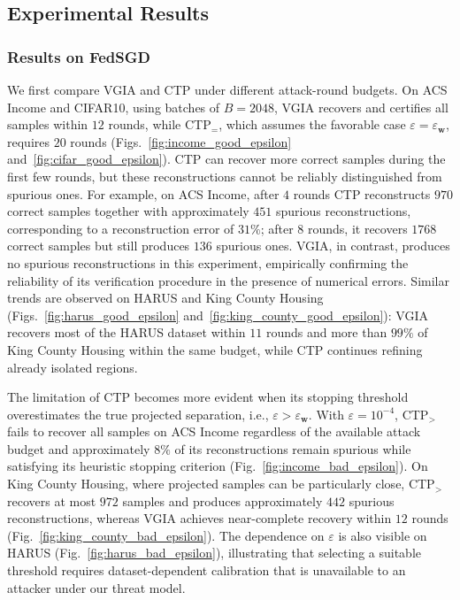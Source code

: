 \subsection{Experimental Results}
\subsubsection{Results on FedSGD}\label{sec:exp_main_vgia}

We first compare VGIA and CTP under different attack-round budgets. On ACS Income and CIFAR10, using batches of $B=2048$, VGIA recovers and certifies all samples within $12$ rounds, while CTP$_{=}$, which assumes the favorable case $\varepsilon=\varepsilon_{\mathbf w}$, requires $20$ rounds (Figs.~\ref{fig:income_good_epsilon} and~\ref{fig:cifar_good_epsilon}). CTP can recover more correct samples during the first few rounds, but these reconstructions cannot be reliably distinguished from spurious ones. For example, on ACS Income, after $4$ rounds CTP reconstructs $970$ correct samples together with approximately $451$ spurious reconstructions, corresponding to a reconstruction error of  $31\%$; after $8$ rounds, it recovers $1768$ correct samples but still produces $136$ spurious ones. VGIA, in contrast, produces no spurious reconstructions in this experiment, empirically confirming the reliability of its verification procedure in the presence of numerical errors. Similar trends are observed on HARUS and King County Housing (Figs.~\ref{fig:harus_good_epsilon} and~\ref{fig:king_county_good_epsilon}): VGIA recovers most of the HARUS dataset within $11$ rounds and more than $99\%$ of King County Housing within the same budget, while CTP continues refining already isolated regions. 

The limitation of CTP becomes more evident when its stopping threshold overestimates the true projected separation, i.e., $\varepsilon>\varepsilon_{\mathbf w}$. With $\varepsilon=10^{-4}$, CTP$_{>}$ fails to recover all samples on ACS Income regardless of the available attack budget and approximately $8\%$ of its reconstructions remain spurious while satisfying its heuristic stopping criterion (Fig.~\ref{fig:income_bad_epsilon}). On King County Housing, where projected samples can be particularly close, CTP$_{>}$ recovers at most $972$ samples and produces approximately $442$ spurious reconstructions, whereas VGIA achieves near-complete recovery within $12$ rounds (Fig.~\ref{fig:king_county_bad_epsilon}). The dependence on $\varepsilon$ is also visible on HARUS (Fig.~\ref{fig:harus_bad_epsilon}), illustrating that selecting a suitable threshold requires dataset-dependent calibration that is unavailable to an attacker under our threat model. 

